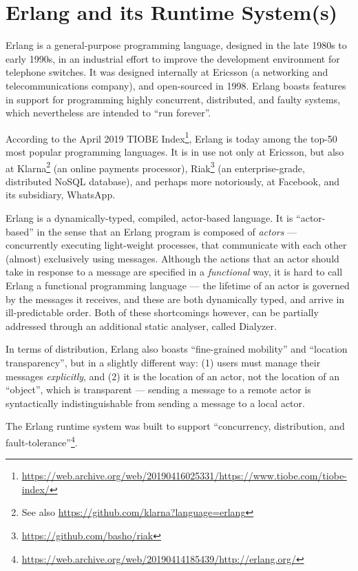 \section{Erlang and its Runtime System(s)}

Erlang is a general-purpose programming language, designed in the late
1980s to early 1990s, in an industrial effort to improve the
development environment for telephone switches\cite{erlang:hopl:2007}.
It was designed internally at Ericsson (a networking and
telecommunications company), and open-sourced in 1998. Erlang boasts
features in support for programming highly concurrent, distributed,
and faulty systems, which nevertheless are intended to ``run
forever''.

According to the April 2019 TIOBE
Index\footnote{\url{https://web.archive.org/web/20190416025331/https://www.tiobe.com/tiobe-index/}},
Erlang is today among the top-50 most popular programming languages.
It is in use not only at
Ericsson\cite{media:2018-03-31:Erlang-20-years}, but also at
Klarna\cite{media:2015-01-09:Klarna-Engineering-Insights}\footnote{See
also \url{https://github.com/klarna?language=erlang}} (an online
payments processor),
Riak\footnote{\url{https://github.com/basho/riak}} (an
enterprise-grade, distributed NoSQL database), and perhaps more
notoriously, at Facebook\cite{media:2008-03-13:facebook-chat}, and its
subsidiary, WhatsApp\cite{media:2014-02-21:Inside-Erlang}.

Erlang is a dynamically-typed, compiled, actor-based language. It is
``actor-based'' in the sense that an Erlang program is composed of
\emph{actors} --- concurrently executing light-weight processes, that
communicate with each other (almost) exclusively using messages.
Although the actions that an actor should take in response to a
message are specified in a \emph{functional} way, it is hard to call
Erlang a functional programming language --- the lifetime of an actor
is governed by the messages it receives, and these are both
dynamically typed, and arrive in ill-predictable order. Both of these
shortcomings however, can be partially addressed through an additional
static analyser, called Dialyzer\cite{erlang:2019:Dialyzer}.

In terms of distribution, Erlang also boasts ``fine-grained mobility''
and ``location transparency'', but in a slightly different way: (1)
users must manage their messages \emph{explicitly}, and (2) it is the
location of an actor, not the location of an ``object'', which is
transparent --- sending a message to a remote actor is syntactically
indistinguishable from sending a message to a local actor.

The Erlang runtime system was built to support ``concurrency,
distribution, and
fault-tolerance''\footnote{\url{https://web.archive.org/web/20190414185439/http://erlang.org/}}.
